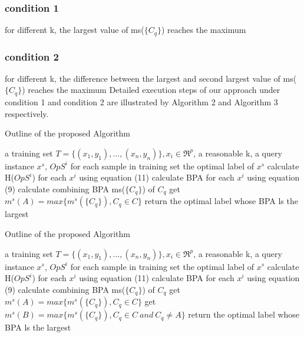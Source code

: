 \documentclass[runningheads]{llncs}
\begin{document}
\subsubsection{condition 1}
for different k, the largest value of ms($\{C_q\}$) reaches the maximum

\subsubsection{condition 2}
for different k, the difference between the largest and second largest value of ms($\{C_q\}$) reaches the maximum
Detailed execution steps of our approach under condition 1 and condition 2 are illustrated by Algorithm 2 and Algorithm 3 respectively.

\begin{algorithm} %
\caption{Outline of the proposed Algorithm} %
\label{alg1} %
\begin{algorithmic}[1] %
\REQUIRE  a training set $T=\{(x_1,y_1),...,(x_n,y_n)\}, x_i \in \Re ^p$,  a reasonable k, a query instance $x^s$, $OpS^i$ for each sample in training set %
\ENSURE the optimal label of $x^s$ %
    \STATE  calculate H($OpS^i$) for each $x^i$ using equation (11)
    \STATE  calculate BPA for each $x^i$ using equation (9)
    \ENDFOR
    \STATE calculate combining BPA ms($\{C_q\}$) of $C_q$
    \ENDFOR
    \STATE get $m^s(A)=max\{m^s(\{C_q\}),C_q \in C\}$
\ENDFOR
\STATE return the optimal label whose BPA ls the largest
\end{algorithmic}
\end{algorithm}

\begin{algorithm} %
\caption{Outline of the proposed Algorithm} %
\label{alg1} %
\begin{algorithmic}[1] %
\REQUIRE  a training set $T=\{(x_1,y_1),...,(x_n,y_n)\}, x_i \in \Re ^p$,  a reasonable k, a query instance $x^s$, $OpS^i$ for each sample in training set %
\ENSURE the optimal label of $x^s$ %
    \STATE  calculate H($OpS^i$) for each $x^i$ using equation (11)
    \STATE  calculate BPA for each $x^i$ using equation (9)
    \ENDFOR
    \STATE calculate combining BPA ms($\{C_q\}$) of $C_q$
    \ENDFOR
    \STATE get $m^s(A)=max\{m^s(\{C_q\}),C_q \in C\}$
    \STATE get $m^s(B)=max\{m^s(\{C_q\}),C_q \in C \ and \ C_q \ne A\}$
\ENDFOR
\STATE return the optimal label whose BPA ls the largest
\end{algorithmic}
\end{algorithm}
\end{document}
